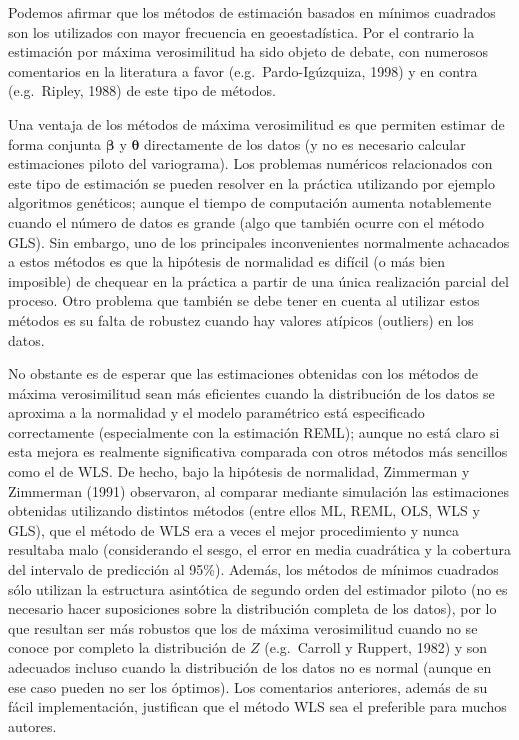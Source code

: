 \documentclass[
]{book}
\theoremstyle{break}
\theoremstyle{definition}
\theoremstyle{definition}
\theoremstyle{definition}
\theoremstyle{definition}
\theoremstyle{remark}
\begin{document}
Podemos afirmar que los métodos de estimación basados en mínimos cuadrados son los utilizados con mayor frecuencia en geoestadística.
Por el contrario la estimación por máxima verosimilitud ha sido objeto de debate, con numerosos comentarios en la literatura a favor (e.g.~Pardo-Igúzquiza, 1998) y en contra (e.g.~Ripley, 1988) de este tipo de métodos.

Una ventaja de los métodos de máxima verosimilitud es que permiten estimar de forma conjunta \(\boldsymbol{\beta}\) y \(\boldsymbol{\theta}\) directamente de los datos (y no es necesario calcular estimaciones piloto del variograma).
Los problemas numéricos relacionados con este tipo de estimación se pueden resolver en la práctica utilizando por ejemplo algoritmos genéticos;
aunque el tiempo de computación aumenta notablemente cuando el número de datos es grande (algo que también ocurre con el método GLS).
Sin embargo, uno de los principales inconvenientes normalmente achacados a estos métodos es que la hipótesis de normalidad es difícil (o más bien imposible) de chequear en la práctica a partir de una única realización parcial del proceso.
Otro problema que también se debe tener en cuenta al utilizar estos métodos es su falta de robustez cuando hay valores atípicos (outliers) en los datos.

No obstante es de esperar que las estimaciones obtenidas con los métodos de máxima verosimilitud sean más eficientes cuando la distribución de los datos se aproxima a la normalidad y el modelo paramétrico está especificado correctamente (especialmente con la estimación REML); aunque no está claro si esta mejora es realmente significativa comparada con otros métodos más sencillos como el de WLS.
De hecho, bajo la hipótesis de normalidad, Zimmerman y Zimmerman (1991) observaron, al comparar mediante simulación las estimaciones obtenidas utilizando
distintos métodos (entre ellos ML, REML, OLS, WLS y GLS), que el método de WLS era a veces el mejor procedimiento y nunca resultaba malo (considerando el sesgo, el error en media cuadrática y la cobertura del intervalo de predicción al 95\%).
Además, los métodos de mínimos cuadrados sólo utilizan la estructura asintótica de segundo orden del estimador piloto (no es necesario hacer suposiciones sobre la distribución completa de los datos), por lo que resultan ser más robustos que los de máxima verosimilitud cuando no se conoce por completo la distribución de \(Z\) (e.g.~Carroll y Ruppert, 1982) y son adecuados incluso cuando la distribución de los datos no es normal (aunque en ese caso pueden no ser los óptimos).
Los comentarios anteriores, además de su fácil implementación, justifican que el método WLS sea el preferible para muchos autores.
\end{document}

